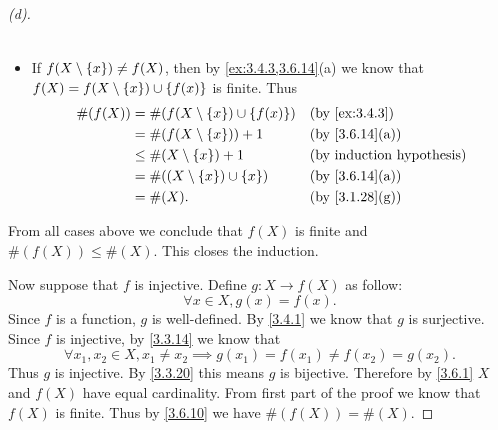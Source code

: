 \begin{proof}[(d)]
\begin{itemize}
\begin{align*}
		      \end{align*}
		\item If \(f(X \setminus \left\lbrace x\right\rbrace) \neq f(X)\), then by \cref{ex:3.4.3,3.6.14}(a) we know that \(f(X) = f(X \setminus \left\lbrace x\right\rbrace) \cup \left\lbrace f(x)\right\rbrace\) is finite.
		      Thus
		      \begin{align*}
			      \#(f(X)) & = \#(f(X \setminus \set{x}) \cup \set{f(x)}) &  & \by{ex:3.4.3}  \\
			               & = \#(f(X \setminus \set{x})) + 1             &  & \by{3.6.14}[a] \\
			               & \leq \#(X \setminus \set{x}) + 1             &  & \byIH          \\
			               & = \#((X \setminus \set{x}) \cup \set{x})     &  & \by{3.6.14}[a] \\
			               & = \#(X).                                     &  & \by{3.1.28}[g]
		      \end{align*}
	\end{itemize}
	From all cases above we conclude that \(f(X)\) is finite and \(\#(f(X)) \leq \#(X)\).
	This closes the induction.

	Now suppose that \(f\) is injective.
	Define \(g : X \to f(X)\) as follow:
	\[
		\forall x \in X, g(x) = f(x).
	\]
	Since \(f\) is a function, \(g\) is well-defined.
	By \cref{3.4.1} we know that \(g\) is surjective.
	Since \(f\) is injective, by \cref{3.3.14} we know that
	\[
		\forall x_1, x_2 \in X, x_1 \neq x_2 \implies g(x_1) = f(x_1) \neq f(x_2) = g(x_2).
	\]
	Thus \(g\) is injective.
	By \cref{3.3.20} this means \(g\) is bijective.
	Therefore by \cref{3.6.1} \(X\) and \(f(X)\) have equal cardinality.
	From first part of the proof we know that \(f(X)\) is finite.
	Thus by \cref{3.6.10} we have \(\#(f(X)) = \#(X)\).
\end{proof}

